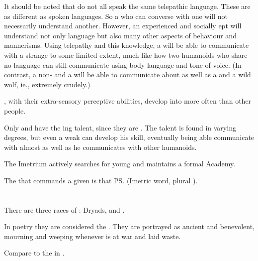 It should be noted that \nycans{} do not all speak the same telepathic language. 
These are as different as spoken languages. 
So a \nycaneer{} who can converse with one \nycan{} will not necessarily understand another. 
However, an experienced and socially ept \nycaneer{} will understand not only language but also many other aspects of \nycan{} behaviour and mannerisms. 
Using telepathy and this knowledge, a \nycaneer{} will be able to communicate with a strange \nycan{} to some limited extent, much like how two humanoids who share no language can still communicate using body language and tone of voice. (In contrast, a non-\nycaneer{} and a \nycan{} will be able to communicate about as well as a \human{} and a wild wolf, ie., extremely crudely.) 



\Nycaneers, with their extra-sensory perceptive abilities, develop into \vertices{} more often than other people. 

Only \scathae{} and \rachyth{} have the \nycaneer ing talent, since they are . 
The talent is found in varying degrees, but even a weak \nycaneer{} can develop his skill, eventually being able communicate with \nycans{} almost as well as he communicates with other humanoids. 

The Imetrium actively searches for young \nycaneers{} and maintains a formal \Nycaneer{} Academy. 

The \nycaneer{} that commands a given \nycan{} is that \ps{\nycan}{} \melda{} (Imetric word, plural \emph{\meldae{}}). 















\section{\Nymph}
There are three races of \quo{\nymphs}: 
Dryads, \naiads{} and \sylphs. 

In poetry they are considered the . 
They are portrayed as ancient and benevolent, mourning and weeping whenever \Miith{} is at war and laid waste. 

Compare to the  in . 

